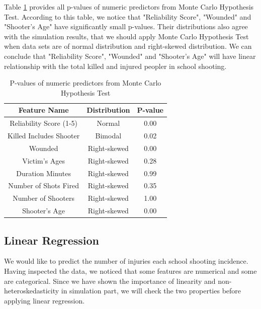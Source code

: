 \documentclass[12pt]{article}
\numberwithin{figure}{section}
\begin{document}
Table \ref{tb2} provides all p-values of numeric predictors from Monte Carlo Hypothesis Test. According to this table, we notice that "Reliability Score", "Wounded" and "Shooter's Age" have significantly small p-values. Their distributions also agree with the simulation results, that we should apply Monte Carlo Hypothesis Test when data sets are of normal distribution and right-skewed distribution. We can conclude that "Reliability Score", "Wounded" and "Shooter's Age" will have linear relationship with the total killed and injured peopler in school shooting.

\begin{table}[H]
\centering
\begin{tabular}{|c|c|c|}
\hline
Feature Name                        & Distribution & P-value                       \\ \hline
Reliability Score (1-5)     & Normal       & 0.00                             \\ \hline
Killed Includes Shooter        & Bimodal       & 0.02                       \\ \hline
Wounded     & Right-skewed      & 0.00                        \\ \hline
Victim's Ages   & Right-skewed       & 0.28                        \\ \hline
Duration Minutes                    & Right-skewed & 0.99 
\\ \hline
Number of Shots Fired             & Right-skewed      & 0.35\\ \hline
Number of Shooters                 & Right-skewed       & 1.00\\ \hline
Shooter's Age & Right-skewed       & 0.00                       \\ \hline
\end{tabular}
\caption{P-values of numeric predictors from Monte Carlo Hypothesis Test}
\label{tb2}
\end{table}


\subsection{Linear Regression}

We would like to predict the number of injuries each school shooting incidence. Having inspected the data, we noticed that some features are numerical and some are categorical. Since we have shown the importance of linearity and non-heteroskedasticity in simulation part, we will check the two properties before applying linear regression. 
\end{document}
